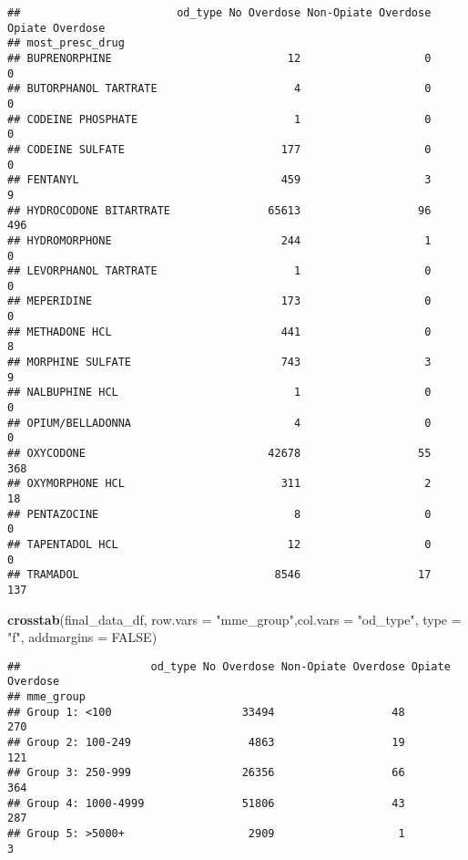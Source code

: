 \documentclass[]{article}
\newenvironment{Shaded}{\begin{snugshade}}{\end{snugshade}}
\newcommand{\KeywordTok}[1]{\textcolor[rgb]{0.13,0.29,0.53}{\textbf{#1}}}
\newcommand{\DataTypeTok}[1]{\textcolor[rgb]{0.13,0.29,0.53}{#1}}
\newcommand{\StringTok}[1]{\textcolor[rgb]{0.31,0.60,0.02}{#1}}
\newcommand{\OtherTok}[1]{\textcolor[rgb]{0.56,0.35,0.01}{#1}}
\newcommand{\NormalTok}[1]{#1}
\begin{document}
\begin{verbatim}
##                        od_type No Overdose Non-Opiate Overdose Opiate Overdose
## most_presc_drug                                                               
## BUPRENORPHINE                           12                   0               0
## BUTORPHANOL TARTRATE                     4                   0               0
## CODEINE PHOSPHATE                        1                   0               0
## CODEINE SULFATE                        177                   0               0
## FENTANYL                               459                   3               9
## HYDROCODONE BITARTRATE               65613                  96             496
## HYDROMORPHONE                          244                   1               0
## LEVORPHANOL TARTRATE                     1                   0               0
## MEPERIDINE                             173                   0               0
## METHADONE HCL                          441                   0               8
## MORPHINE SULFATE                       743                   3               9
## NALBUPHINE HCL                           1                   0               0
## OPIUM/BELLADONNA                         4                   0               0
## OXYCODONE                            42678                  55             368
## OXYMORPHONE HCL                        311                   2              18
## PENTAZOCINE                              8                   0               0
## TAPENTADOL HCL                          12                   0               0
## TRAMADOL                              8546                  17             137
\end{verbatim}

\begin{Shaded}
\begin{Highlighting}[]
\KeywordTok{crosstab}\NormalTok{(final_data_df, }\DataTypeTok{row.vars =} \StringTok{"mme_group"}\NormalTok{,}\DataTypeTok{col.vars =} \StringTok{"od_type"}\NormalTok{, }\DataTypeTok{type =} \StringTok{"f"}\NormalTok{, }\DataTypeTok{addmargins =} \OtherTok{FALSE}\NormalTok{)}
\end{Highlighting}
\end{Shaded}

\begin{verbatim}
##                    od_type No Overdose Non-Opiate Overdose Opiate Overdose
## mme_group                                                                 
## Group 1: <100                    33494                  48             270
## Group 2: 100-249                  4863                  19             121
## Group 3: 250-999                 26356                  66             364
## Group 4: 1000-4999               51806                  43             287
## Group 5: >5000+                   2909                   1               3
\end{verbatim}
\end{document}
